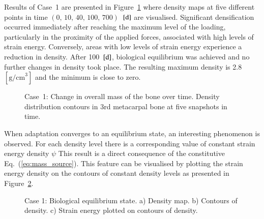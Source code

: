 \documentclass[review]{elsarticle}
\numberwithin{equation}{section}
\begin{document}
Results of Case~1 are presented in Figure~\ref{fig:mc3_density} where density maps at five different points in time $(\text{0, 10, 40, 100, 700})$~$[\text d]$ are visualised. 
Significant densification occurred immediately after reaching the maximum level of the loading, particularly in the proximity of the applied forces, associated with high levels of strain energy. Conversely, areas with low levels of strain energy experience a reduction in density.
After 100~$[{\text d}]$, biological equilibrium was achieved and no further changes in density took place. 
The resulting maximum density is 2.8~$[{\text {g/cm}}^3]$ and the minimum is close to zero.
\begin{figure}[h!]
	\centering
	\caption{Case~1: Change in overall mass of the bone over time. Density distribution contours in 3rd metacarpal bone at five snapshots in time.}
	\label{fig:mc3_density}
\end{figure}



When adaptation converges to an equilibrium state, an interesting phenomenon is observed.
For each density level there is a corresponding value of constant strain energy density $\psi$
This result is a direct consequence of the constitutive Eq.~(\ref{eq:mass_source}).
This feature can be visualised by plotting the strain energy density on the contours of constant density levels as presented in Figure~\ref{fig:mc3_biol_eq}. 


\begin{figure}
	\centering
	\def\svgwidth{14cm}
	
	\caption{Case 1: Biological equilibrium state. a) Density map. b) Contours of density. c) Strain energy plotted on contours of density.}
	\label{fig:mc3_biol_eq}
\end{figure}
\end{document}
